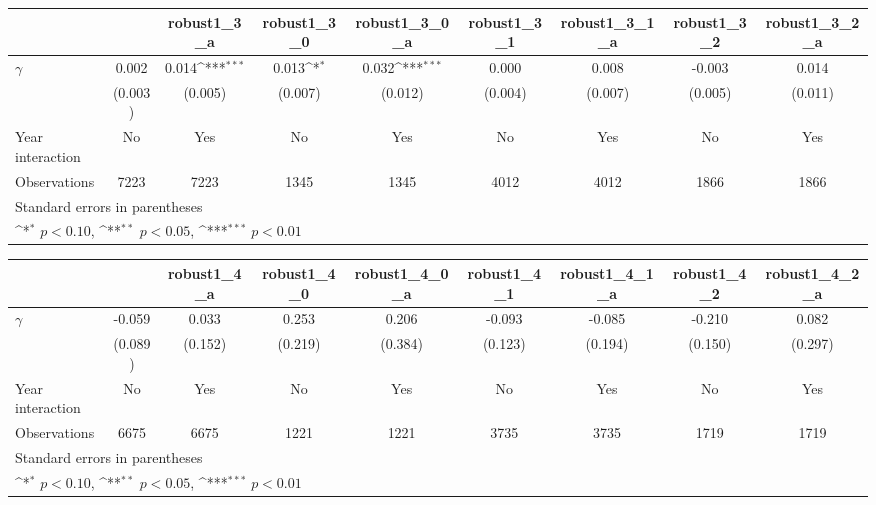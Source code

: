 {
\def\sym#1{\ifmmode^{#1}\else\(^{#1}\)\fi}
\begin{tabular}{l*{8}{c}}
\toprule
                &\multicolumn{1}{c}{}&\multicolumn{1}{c}{robust1\_3\_a}&\multicolumn{1}{c}{robust1\_3\_0}&\multicolumn{1}{c}{robust1\_3\_0\_a}&\multicolumn{1}{c}{robust1\_3\_1}&\multicolumn{1}{c}{robust1\_3\_1\_a}&\multicolumn{1}{c}{robust1\_3\_2}&\multicolumn{1}{c}{robust1\_3\_2\_a}\\
\midrule
$\gamma$        &    0.002         &    0.014\sym{***}&    0.013\sym{*}  &    0.032\sym{***}&    0.000         &    0.008         &   -0.003         &    0.014         \\
                &  (0.003)         &  (0.005)         &  (0.007)         &  (0.012)         &  (0.004)         &  (0.007)         &  (0.005)         &  (0.011)         \\
\addlinespace
Year interaction &       No         &      Yes         &       No         &      Yes         &       No         &      Yes         &       No         &      Yes         \\
\midrule
Observations    &     7223         &     7223         &     1345         &     1345         &     4012         &     4012         &     1866         &     1866         \\
\bottomrule
\multicolumn{9}{l}{\footnotesize Standard errors in parentheses}\\
\multicolumn{9}{l}{\footnotesize \sym{*} \(p<0.10\), \sym{**} \(p<0.05\), \sym{***} \(p<0.01\)}\\
\end{tabular}
}
{
\def\sym#1{\ifmmode^{#1}\else\(^{#1}\)\fi}
\begin{tabular}{l*{8}{c}}
\toprule
                &\multicolumn{1}{c}{}&\multicolumn{1}{c}{robust1\_4\_a}&\multicolumn{1}{c}{robust1\_4\_0}&\multicolumn{1}{c}{robust1\_4\_0\_a}&\multicolumn{1}{c}{robust1\_4\_1}&\multicolumn{1}{c}{robust1\_4\_1\_a}&\multicolumn{1}{c}{robust1\_4\_2}&\multicolumn{1}{c}{robust1\_4\_2\_a}\\
\midrule
$\gamma$        &   -0.059         &    0.033         &    0.253         &    0.206         &   -0.093         &   -0.085         &   -0.210         &    0.082         \\
                &  (0.089)         &  (0.152)         &  (0.219)         &  (0.384)         &  (0.123)         &  (0.194)         &  (0.150)         &  (0.297)         \\
\addlinespace
Year interaction &       No         &      Yes         &       No         &      Yes         &       No         &      Yes         &       No         &      Yes         \\
\midrule
Observations    &     6675         &     6675         &     1221         &     1221         &     3735         &     3735         &     1719         &     1719         \\
\bottomrule
\multicolumn{9}{l}{\footnotesize Standard errors in parentheses}\\
\multicolumn{9}{l}{\footnotesize \sym{*} \(p<0.10\), \sym{**} \(p<0.05\), \sym{***} \(p<0.01\)}\\
\end{tabular}
}
